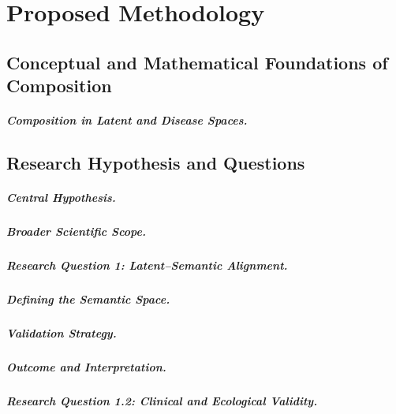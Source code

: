 \chapter{Proposed Methodology}
\label{chap:methodology}

\section{Conceptual and Mathematical Foundations of Composition}
\label{sec:composition_foundations}

\paragraph{Composition in Latent and Disease Spaces.}

\section{Research Hypothesis and Questions}
\label{sec:research_hypothesis}

\paragraph{Central Hypothesis.}

\paragraph{Broader Scientific Scope.}

\paragraph{Research Question 1: Latent–Semantic Alignment.}

\paragraph{Defining the Semantic Space.}

\paragraph{Validation Strategy.}

\paragraph{Outcome and Interpretation.}

\paragraph{Research Question 1.2: Clinical and Ecological Validity.}

